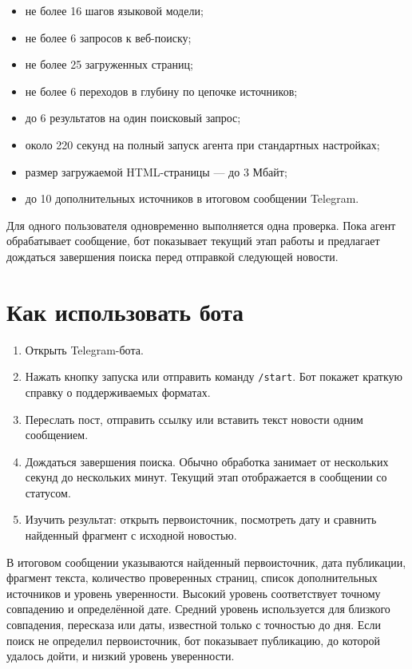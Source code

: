 \documentclass[11pt,a4paper]{article}
\begin{document}
\begin{itemize}[leftmargin=1.8em]
    \item не более 16 шагов языковой модели;
    \item не более 6 запросов к веб-поиску;
    \item не более 25 загруженных страниц;
    \item не более 6 переходов в глубину по цепочке источников;
    \item до 6 результатов на один поисковый запрос;
    \item около 220 секунд на полный запуск агента при стандартных настройках;
    \item размер загружаемой HTML-страницы --- до 3 Мбайт;
    \item до 10 дополнительных источников в итоговом сообщении Telegram.
\end{itemize}

Для одного пользователя одновременно выполняется одна проверка. Пока агент обрабатывает сообщение, бот показывает текущий этап работы и предлагает дождаться завершения поиска перед отправкой следующей новости.

\section*{Как использовать бота}

\begin{enumerate}[leftmargin=2em]
    \item Открыть Telegram-бота.
    \item Нажать кнопку запуска или отправить команду \texttt{/start}. Бот покажет краткую справку о поддерживаемых форматах.
    \item Переслать пост, отправить ссылку или вставить текст новости одним сообщением.
    \item Дождаться завершения поиска. Обычно обработка занимает от нескольких секунд до нескольких минут. Текущий этап отображается в сообщении со статусом.
    \item Изучить результат: открыть первоисточник, посмотреть дату и сравнить найденный фрагмент с исходной новостью.
\end{enumerate}

В итоговом сообщении указываются найденный первоисточник, дата публикации, фрагмент текста, количество проверенных страниц, список дополнительных источников и уровень уверенности. Высокий уровень соответствует точному совпадению и определённой дате. Средний уровень используется для близкого совпадения, пересказа или даты, известной только с точностью до дня. Если поиск не определил первоисточник, бот показывает публикацию, до которой удалось дойти, и низкий уровень уверенности.
\end{document}
